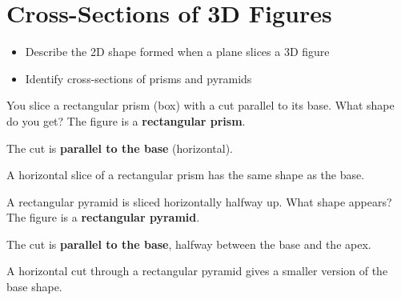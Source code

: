 \section{Cross-Sections of 3D Figures}

\begin{stepGoal}
\begin{itemize}
    \item Describe the 2D shape formed when a plane slices a 3D figure
    \item Identify cross-sections of prisms and pyramids
\end{itemize}
\end{stepGoal}

\begin{stepVocabBox}
\end{stepVocabBox}

\begin{stepsCard}
\end{stepsCard}

\begin{stepExample}{You slice a rectangular prism (box) with a cut parallel to its base. What shape do you get?}
     The figure is a \textbf{rectangular prism}.

     The cut is \textbf{parallel to the base} (horizontal).

     A horizontal slice of a rectangular prism has the same shape as the base.
\end{stepExample}

\begin{stepExample}{A rectangular pyramid is sliced horizontally halfway up. What shape appears?}
     The figure is a \textbf{rectangular pyramid}.

     The cut is \textbf{parallel to the base}, halfway between the base and the apex.

     A horizontal cut through a rectangular pyramid gives a smaller version of the base shape.
\end{stepExample}

